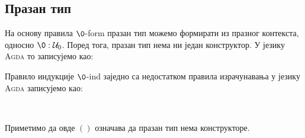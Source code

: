 \subsection{Празан тип}

На основу правила $\0$-form празан тип можемо формирати из празног контекста, односно $\0 : \mathcal{U}_0$. Поред тога, празан тип нема ни један конструктор. У језику \textsc{Agda} то записујемо као:

\begin{code}%
\>[0]\AgdaSpace{}%
\AgdaSpace{}%
\AgdaSymbol{:}\AgdaSpace{}%
\AgdaSpace{}%
\AgdaSpace{}%
\<%
\end{code}

Правило индукције $\0$-ind заједно са недостатком правила израчунавања у језику \textsc{Agda} записујемо као:
\begin{code}%
\>[0]\AgdaSpace{}%
\AgdaSymbol{:}\AgdaSpace{}%
\AgdaSymbol{(}\AgdaSpace{}%
\AgdaSymbol{:}\AgdaSpace{}%
\AgdaSpace{}%
\AgdaSpace{}%
\AgdaSpace{}%
\AgdaSpace{}%
\AgdaSymbol{)}\AgdaSpace{}%
\AgdaSpace{}%
\AgdaSymbol{(}\AgdaSpace{}%
\AgdaSymbol{:}\AgdaSpace{}%
\AgdaSymbol{)}\AgdaSpace{}%
\AgdaSpace{}%
\AgdaSpace{}%
\<%
\\
\>[0]\AgdaSpace{}%
\AgdaSpace{}%
\AgdaSymbol{()}\<%
\end{code}
Приметимо да овде $()$ означава да празан тип нема конструкторе.


